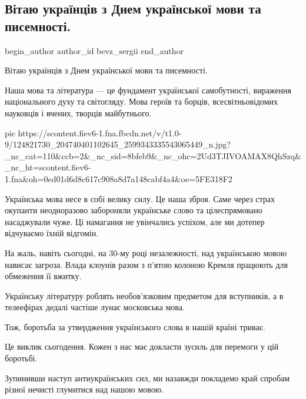  
 
 
 
 
 
\subsection{Вітаю українців з Днем української мови та писемності.}
\label{sec:09_11_2020.fb.bevz_sergii.1.den_ukr_movy}
\ifcmt
	begin_author
   author_id bevz_sergii
	end_author
\fi

Вітаю українців з Днем української мови та писемності.

Наша мова та література — це фундамент української самобутності, вираження
національного духу та світогляду. Мова героїв та борців, всесвітньовідомих
науковців і вчених, творців майбутнього.

\ifcmt
pic https://scontent.fiev6-1.fna.fbcdn.net/v/t1.0-9/124821730_204740401102645_2599343335543065449_n.jpg?_nc_cat=110&ccb=2&_nc_sid=8bfeb9&_nc_ohc=2Ud3TJIVOAMAX8QhSzq&_nc_ht=scontent.fiev6-1.fna&oh=0ed01d6d8c617c908a8d7a148cabf4a4&oe=5FE318F2
\fi

Українська мова несе в собі велику силу. Це наша зброя. Саме через страх
окупанти неодноразово забороняли українське слово та цілеспрямовано насаджували
чуже. Ці намагання не увінчались успіхом, але ми дотепер відчуваємо їхній
відгомін.

На жаль, навіть сьогодні, на 30-му році незалежності, над українською мовою
нависає загроза. Влада клоунів разом з  п'ятою колоною Кремля працюють для
обмеження її вжитку. 

Українську літературу роблять необов'язковим предметом для вступників, а в
телеефірах дедалі частіше лунає московська мова.

Тож, боротьба за утвердження українського слова в нашій країні триває. 

Це виклик сьогодення. Кожен з нас має докласти зусиль для перемоги у цій
боротьбі. 

Зупинивши наступ антиукраїнських сил, ми назавжди покладемо край спробам різної
нечисті глумитися над нашою мовою.
